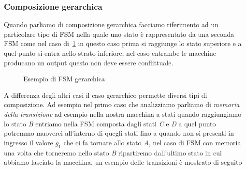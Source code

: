 \subsubsection{Composizione gerarchica}
Quando parliamo di composizione gerarchica facciamo riferimento ad un particolare tipo di FSM nella quale uno stato è rappresentato da una seconda FSM come nel caso di \figurename\,\ref{fig:gerarchica} in questo caso prima si raggiunge lo stato superiore e a quel punto si entra nello strato inferiore, nel caso entrambe le macchine producano un output questo non deve essere conflittuale.\\
\begin{figure}
\centering
{}
\caption{Esempio di FSM gerarchica}\label{fig:gerarchica}
\end{figure}
A differenza degli altri casi il caso gerarchico permette diversi tipi di composizione. Ad esempio nel primo caso che analizziamo parliamo di \emph{memoria della transizione} ad esempio nella nostra macchina a stati quando raggiungiamo lo stato \emph{B} entriamo nella FSM composta dagli stati \emph{C} e \emph{D} a quel punto potremmo muoverci all'interno di quegli stati fino a quando non si presenti in ingresso il valore $g_1$ che ci fa tornare allo stato \emph{A}, nel caso di FSM con memoria una volta che torneremo nello stato \emph{B} ripartiremo dall'ultimo stato in cui abbiamo lasciato la macchina, un esempio delle transizioni è mostrato di seguito
